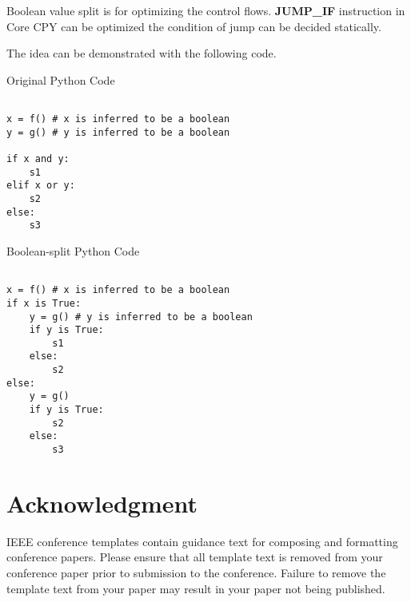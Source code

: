 \documentclass[conference]{IEEEtran}
\begin{document}
Boolean value split is for optimizing the control flows.
\textbf{JUMP\_IF} instruction in Core CPY can be optimized
the condition of jump can be decided statically.

The idea can be demonstrated with the following code.

\begin{center}
Original Python Code
\end{center}

\lstset{language=Python, showlines=true, mathescape=true}
\begin{lstlisting}

x = f() # x is inferred to be a boolean
y = g() # y is inferred to be a boolean

if x and y:
    s1
elif x or y:
    s2
else:
    s3

\end{lstlisting}

\begin{center}
Boolean-split Python Code
\end{center}


\lstset{language=Python, showlines=true, mathescape=true}
\begin{lstlisting}

x = f() # x is inferred to be a boolean
if x is True:
    y = g() # y is inferred to be a boolean
    if y is True:
        s1
    else:
        s2
else:
    y = g()
    if y is True:
        s2
    else:
        s3

\end{lstlisting}


\section*{Acknowledgment}


\medskip





\vspace{12pt}
\color{red}
IEEE conference templates contain guidance text for composing and formatting conference papers. Please ensure that all template text is removed from your conference paper prior to submission to the conference. Failure to remove the template text from your paper may result in your paper not being published.
\end{document}
